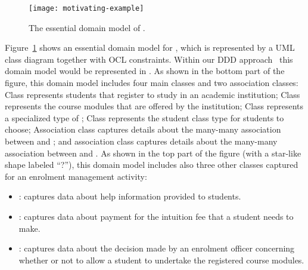 \begin{figure}[th]
	\vspace{-0.3cm}
	\begin{center}
		\texttt{[image: motivating-example]}
	\end{center}
    \vspace{-0.6cm}
	\caption{The essential domain model of \courseman.}
    \vspace{-0.3cm}	
	\label{fig:motivatingExample}
\end{figure}

Figure~\ref{fig:motivatingExample} shows an essential domain model for , which is represented by a UML class diagram together with OCL constraints. Within our DDD approach~\cite{le_domain_2018} this domain model would be represented in \dcsl. As shown in the bottom part of the figure, this domain model includes four main classes and two association classes: Class  represents students that register to study in an academic institution; Class  represents the course modules that are offered by the institution; Class  represents a specialized type of ; Class  represents the student class type for students to choose; Association class  captures details about the many-many association between  and ; and association class  captures details about the many-many association between  and .
As shown in the top part of the figure (with a star-like shape labeled ``?''), this domain model includes also three other classes captured for an enrolment management activity: 
%

\begin{itemize}[noitemsep,topsep=0pt]
  \item {}: captures data about help information provided to students.
  \item {}: captures data about payment for the intuition fee that a student needs to make.
  \item {}: captures data about the decision made by an enrolment officer concerning whether or not to allow a student to undertake the registered course modules.
\end{itemize}


